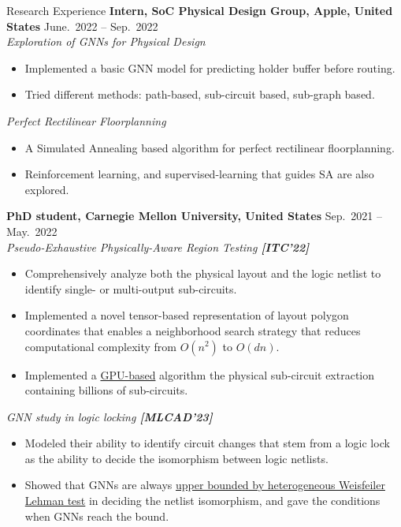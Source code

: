 \begin{rSection}{Research Experience}
{\bf Intern, SoC Physical Design Group, Apple, United States}               \hfill { June.~2022 -- Sep.~2022} \\
\textit{Exploration of GNNs for Physical Design }
\begin{itemize}[noitemsep,topsep=-5pt]
    \item Implemented a basic GNN model for predicting holder buffer before routing.
    \item Tried different methods: path-based, sub-circuit based, sub-graph based.
\end{itemize}
\textit{Perfect Rectilinear Floorplanning}
\begin{itemize}[noitemsep,topsep=-5pt]
    \item A Simulated Annealing based algorithm for perfect rectilinear floorplanning.
    \item Reinforcement learning, and supervised-learning that guides SA are also explored.\\
\end{itemize}

{\bf PhD student, Carnegie Mellon University, United States}               \hfill { Sep.~2021 -- May.~2022} \\
\textit{Pseudo-Exhaustive Physically-Aware Region Testing \textbf{[{ITC'22}]}}
\begin{itemize}[noitemsep,topsep=-5pt]
    \item Comprehensively analyze both the physical layout and the logic netlist to identify single- or multi-output sub-circuits.
    \item Implemented a novel tensor-based representation of layout polygon coordinates that enables a neighborhood
    search strategy that reduces computational complexity
    from $O(n^2)$ to $O(dn)$.
    \item Implemented a \underline{GPU-based} algorithm the physical sub-circuit extraction containing billions of sub-circuits.
\end{itemize}
\textit{GNN study in logic locking \textbf{[{MLCAD'23}]}} 
\begin{itemize}[noitemsep,topsep=-5pt]
    \item Modeled their ability to identify circuit
    changes that stem from a logic lock as the ability to {decide
    the isomorphism between logic netlists.}
    \item Showed that GNNs
    are always \underline{upper bounded by heterogeneous Weisfeiler Lehman
    test} in deciding the netlist isomorphism, and gave the conditions
    when GNNs reach the bound. \\
\end{itemize}


\end{rSection}
